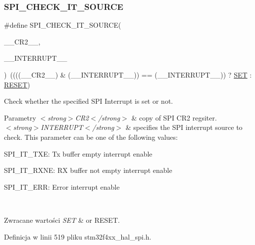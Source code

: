 \subsubsection{\texorpdfstring{S\+P\+I\+\_\+\+C\+H\+E\+C\+K\+\_\+\+I\+T\+\_\+\+S\+O\+U\+R\+CE}{SPI\_CHECK\_IT\_SOURCE}}
{\footnotesize\ttfamily \#define S\+P\+I\+\_\+\+C\+H\+E\+C\+K\+\_\+\+I\+T\+\_\+\+S\+O\+U\+R\+CE(\begin{DoxyParamCaption}\item[{}]{\+\_\+\+\_\+\+C\+R2\+\_\+\+\_\+,  }\item[{}]{\+\_\+\+\_\+\+I\+N\+T\+E\+R\+R\+U\+P\+T\+\_\+\+\_\+ }\end{DoxyParamCaption})~((((\+\_\+\+\_\+\+C\+R2\+\_\+\+\_\+) \& (\+\_\+\+\_\+\+I\+N\+T\+E\+R\+R\+U\+P\+T\+\_\+\+\_\+)) == (\+\_\+\+\_\+\+I\+N\+T\+E\+R\+R\+U\+P\+T\+\_\+\+\_\+)) ? \hyperlink{group___exported__types_gga89136caac2e14c55151f527ac02daaffab44c8101cc294c074709ec1b14211792}{S\+ET} \+: \hyperlink{group___exported__types_gga89136caac2e14c55151f527ac02daaffa589b7d94a3d91d145720e2fed0eb3a05}{R\+E\+S\+ET})}



Check whether the specified S\+PI Interrupt is set or not. 


\begin{DoxyParams}{Parametry}
{\em $<$strong$>$\+C\+R2$<$/strong$>$} & copy of S\+PI C\+R2 regsiter. \\
\hline
{\em $<$strong$>$\+I\+N\+T\+E\+R\+R\+U\+P\+T$<$/strong$>$} & specifies the S\+PI interrupt source to check. This parameter can be one of the following values\+: \begin{DoxyItemize}
\item S\+P\+I\+\_\+\+I\+T\+\_\+\+T\+XE\+: Tx buffer empty interrupt enable \item S\+P\+I\+\_\+\+I\+T\+\_\+\+R\+X\+NE\+: RX buffer not empty interrupt enable \item S\+P\+I\+\_\+\+I\+T\+\_\+\+E\+RR\+: Error interrupt enable \end{DoxyItemize}
\\
\hline
\end{DoxyParams}

\begin{DoxyRetVals}{Zwracane wartości}
{\em S\+ET} & or R\+E\+S\+ET. \\
\hline
\end{DoxyRetVals}


Definicja w linii 519 pliku stm32f4xx\+\_\+hal\+\_\+spi.\+h.

\mbox{\label{group___s_p_i___private___macros_gab120a0085b72939e7d19c4f6b3381a99}} 
